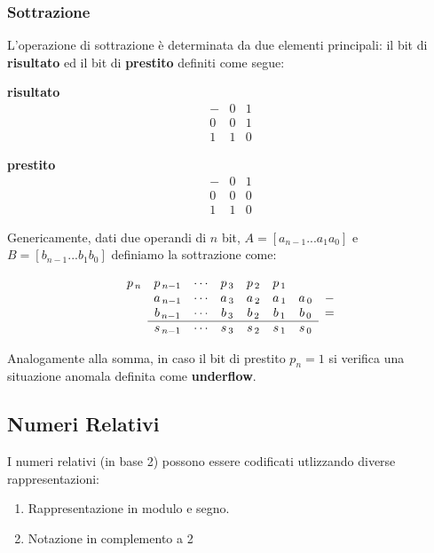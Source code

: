 \documentclass[oneside]{scrbook}
\begin{document}
\subsubsection{Sottrazione}
L'operazione di sottrazione è determinata da due elementi principali: il bit di \textbf{risultato} ed il bit di \textbf{prestito} definiti come segue:
\begin{center}
    \begin{minipage}[t]{0.45\textwidth}
        \centering
        \textbf{risultato}
        \[
        \begin{array}{c|cc}
             - & 0 & 1 \\
            \hline
            0 & 0 & 1 \\
            1 & 1 & 0
        \end{array}
        \]
    \end{minipage}%
    \begin{minipage}[t]{0.45\textwidth}
        \centering
        \textbf{prestito}
        \[
        \begin{array}{c|cc}
             - & 0 & 1 \\
            \hline
            0 & 0 & 0 \\
            1 & 1 & 0
        \end{array}
        \]
    \end{minipage}
\end{center}
Genericamente, dati due operandi di $n$ bit, $A = [a_{n-1}...a_1a_0]$ e $B = [b_{n-1}...b_1b_0]$ definiamo la sottrazione come:

\[
\begin{array}{*7{c}c} 
    p_{\,n} & p_{\,n-1} & \cdots & p_{\,3} & p_{\,2} & p_{\,1} & \phantom{a_0} & \\
    \phantom{c_n} & a_{\,n-1} & \cdots & a_{\,3} & a_{\,2} & a_{\,1} & a_{\,0} & - \\
    & b_{\,n-1} & \cdots & b_{\,3} & b_{\,2} & b_{\,1} & b_{\,0} & = \\
    \cline{2-7}
    \phantom{+} & s_{\,n-1} & \cdots & s_{\,3} & s_{\,2} & s_{\,1} & s_{\,0} &
\end{array}
\]

Analogamente alla somma, in caso il bit di prestito $p_n = 1$ si verifica una situazione anomala definita come \textbf{underflow}.

\subsection{Numeri Relativi}
I numeri relativi (in base 2) possono essere codificati utlizzando diverse rappresentazioni: 
\begin{enumerate}
    \item Rappresentazione in modulo e segno.
    \item Notazione in complemento a 2
\end{enumerate}
\end{document}
